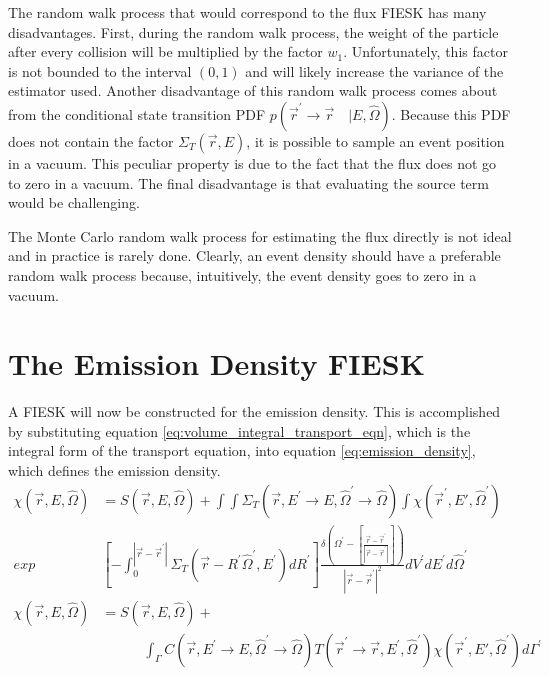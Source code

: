 The random walk process that would correspond to the flux FIESK has many
disadvantages. First, during the random walk process, the weight of the 
particle after every collision will be multiplied by the factor $w_1$. 
Unfortunately, this factor is not bounded to the interval $(0,1)$ and will 
likely increase the variance of the estimator used. Another disadvantage of 
this random walk process comes about from the conditional state transition PDF 
$p(\vec{r}^{'} \to \vec{r}\quad| E,\hat{\Omega})$. Because this PDF does not 
contain the factor $\Sigma_T(\vec{r},E)$, it is possible to sample an event 
position in a vacuum. This peculiar property is due to the fact that the flux 
does not go to zero in a vacuum. The final disadvantage is that evaluating the 
source term would be challenging.

The Monte Carlo random walk process for estimating the flux directly is not 
ideal and in practice is rarely done. Clearly, an event density should have
a preferable random walk process because, intuitively, the event density
goes to zero in a vacuum. 

\section{The Emission Density FIESK}
A FIESK will now be constructed for the emission density. This is accomplished 
by substituting equation \ref{eq:volume_integral_transport_eqn}, which is the
integral form of the transport equation, into equation 
\ref{eq:emission_density}, which defines the emission density. 
\begin{align}
    \chi(\vec{r},E,\hat{\Omega}) & = S(\vec{r},E,\hat{\Omega}) +
    \int\int \Sigma_T(\vec{r},E^{'} \to E, \hat{\Omega}^{'} \to \hat{\Omega})
    \int \chi(\vec{r}^{'},E',\hat{\Omega}^{'}) \nonumber \\
    exp&\left[-\int_0^{|\vec{r} - \vec{r}^{'}|} 
      \Sigma_T(\vec{r}-R^{'}\hat{\Omega}^{'},E^{'})dR^{'} \right]
    \frac{\delta \left(\Omega^{'} - \left[\frac{\vec{r} - \vec{r}^{'}}
        {|\vec{r} - \vec{r}^{'}|}\right]\right)}
    {|\vec{r} - \vec{r}^{'}|^2} dV^{'}dE^{'}d\hat{\Omega}^{'} \nonumber \\
    \chi(\vec{r},E,\hat{\Omega}) & = S(\vec{r},E,\hat{\Omega}) + \nonumber \\
    & \qquad \quad
    \int_{\Gamma}C(\vec{r},E^{'} \to E,\hat{\Omega}^{'} \to \hat{\Omega})
    T(\vec{r}^{'} \to \vec{r},E^{'},\hat{\Omega}^{'}) 
    \chi(\vec{r}^{'},E',\hat{\Omega}^{'}) d\Gamma^{'}
  \label{eq:emission_density_integral_eqn}
\end{align}

